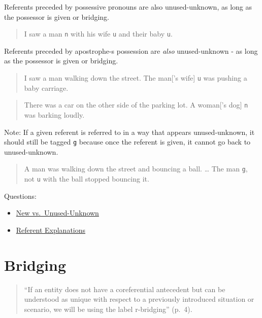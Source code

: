 \documentclass[
]{book}
\providecommand{\tightlist}{%
  \setlength{\itemsep}{0pt}\setlength{\parskip}{0pt}}
\begin{document}
Referents preceded by possessive pronouns are also unused-unknown,
as long as the possessor is given or bridging.

\begin{quote}
I saw a man \texttt{n} with his wife \texttt{u} and their baby \texttt{u}.
\end{quote}

Referents preceded by apostrophe-s possession are \emph{also} unused-unknown -
as long as the possessor is given or bridging.

\begin{quote}
I saw a man walking down the street.
The man{[}'s wife{]} \texttt{u} was pushing a baby carriage.
\end{quote}

\begin{quote}
There was a car on the other side of the parking lot.
A woman{[}'s dog{]} \texttt{n} was barking loudly.
\end{quote}

Note:
If a given referent is referred to in a way that appears
unused-unknown, it should still be tagged \texttt{g}
because once the referent is given, it cannot go back to unused-unknown.

\begin{quote}
A man was walking down the street and bouncing a ball.
\ldots{}
The man \texttt{g}, not \texttt{u} with the ball stopped bouncing it.
\end{quote}

Questions:

\begin{itemize}
\tightlist
\item
  \protect\hyperlink{new-vs.-unused-unknown}{New vs.~Unused-Unknown}
\item
  \protect\hyperlink{referent-explanations}{Referent Explanations}
\end{itemize}

\hypertarget{bridging}{%
\section{Bridging}\label{bridging}}

\begin{quote}
``If an entity does not have a coreferential antecedent but can be understood as unique with respect to a previously introduced situation or scenario, we will be using the label r-bridging'' (p.~4).
\end{quote}
\end{document}
